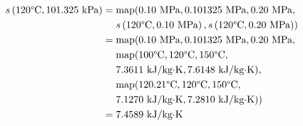 \begin{align}
s\left(
120\text{\textdegree C},
101.325 \text{ kPa}
\right) 
&= 
\text{map}(
0.10 \text{ MPa},
0.101325 \text{ MPa},
0.20 \text{ MPa}, \nonumber \\
& \phantom{=.} 
s\left(
120\text{\textdegree C},
0.10 \text{ MPa}
\right),
s\left(
120\text{\textdegree C},
0.20 \text{ MPa}
\right)
) \nonumber \\
&= 
\text{map}(
0.10 \text{ MPa},
0.101325 \text{ MPa},
0.20 \text{ MPa}, \nonumber \\
& \phantom{=.}
\text{map}(
100\text{\textdegree C},
120\text{\textdegree C},
150\text{\textdegree C}, \nonumber \\
& \phantom{=.} 
7.3611 \text{ kJ/kg$\cdot$K},
7.6148 \text{ kJ/kg$\cdot$K}
), \nonumber \\
& \phantom{=.}
\text{map}(
120.21\text{\textdegree C},
120\text{\textdegree C},
150\text{\textdegree C}, \nonumber \\
& \phantom{=.} 
7.1270 \text{ kJ/kg$\cdot$K},
7.2810 \text{ kJ/kg$\cdot$K}
) 
) \nonumber \\
&= 7.4589 \text{ kJ/kg$\cdot$K} \nonumber
\end{align}